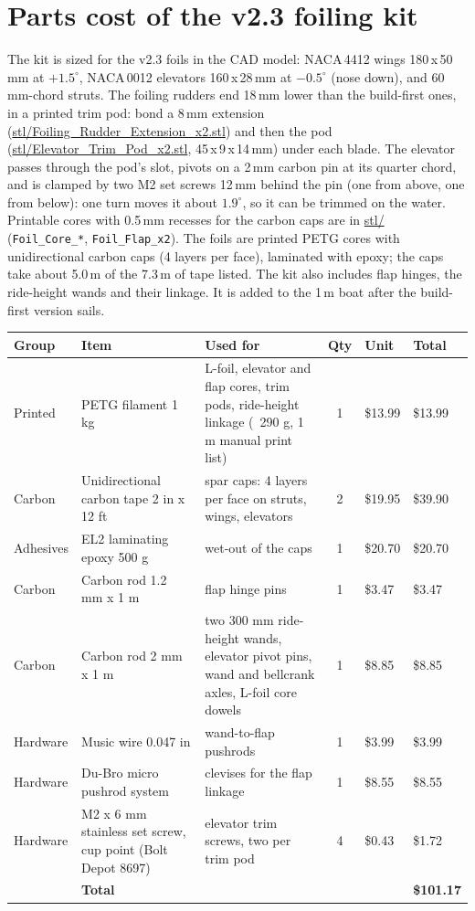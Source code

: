 \documentclass[11pt]{article}
\begin{document}
\section{Parts cost of the v2.3 foiling kit}
The kit is sized for the v2.3 foils in the CAD model: NACA\,4412 wings 180\,x\,50\,mm at $+1.5^\circ$, NACA\,0012 elevators 160\,x\,28\,mm at $-0.5^\circ$ (nose down), and 60\,mm-chord struts. The foiling rudders end 18\,mm lower than the build-first ones, in a printed trim pod: bond a 8\,mm extension (\url{stl/Foiling_Rudder_Extension_x2.stl}) and then the pod (\url{stl/Elevator_Trim_Pod_x2.stl}, 45\,x\,9\,x\,14\,mm) under each blade. The elevator passes through the pod's slot, pivots on a 2\,mm carbon pin at its quarter chord, and is clamped by two M2 set screws 12\,mm behind the pin (one from above, one from below): one turn moves it about $1.9^\circ$, so it can be trimmed on the water. Printable cores with 0.5\,mm recesses for the carbon caps are in \url{stl/} (\texttt{Foil\_Core\_*}, \texttt{Foil\_Flap\_x2}). The foils are printed PETG cores with unidirectional carbon caps (4 layers per face), laminated with epoxy; the caps take about 5.0\,m of the 7.3\,m of tape listed. The kit also includes flap hinges, the ride-height wands and their linkage. It is added to the 1\,m boat after the build-first version sails.
{\small
\begin{longtable}{p{1.5cm}p{4.3cm}p{5.0cm}cp{1.2cm}p{1.2cm}}
\toprule
\textbf{Group} & \textbf{Item} & \textbf{Used for} & \textbf{Qty} & \textbf{Unit} & \textbf{Total} \\
\midrule\endhead
Printed & PETG filament 1 kg & L-foil, elevator and flap cores, trim pods, ride-height linkage (~290 g, 1 m manual print list) & 1 & \$13.99 & \$13.99 \\
Carbon & Unidirectional carbon tape 2 in x 12 ft & spar caps: 4 layers per face on struts, wings, elevators & 2 & \$19.95 & \$39.90 \\
Adhesives & EL2 laminating epoxy 500 g & wet-out of the caps & 1 & \$20.70 & \$20.70 \\
Carbon & Carbon rod 1.2 mm x 1 m & flap hinge pins & 1 & \$3.47 & \$3.47 \\
Carbon & Carbon rod 2 mm x 1 m & two 300 mm ride-height wands, elevator pivot pins, wand and bellcrank axles, L-foil core dowels & 1 & \$8.85 & \$8.85 \\
Hardware & Music wire 0.047 in & wand-to-flap pushrods & 1 & \$3.99 & \$3.99 \\
Hardware & Du-Bro micro pushrod system & clevises for the flap linkage & 1 & \$8.55 & \$8.55 \\
Hardware & M2 x 6 mm stainless set screw, cup point (Bolt Depot 8697) & elevator trim screws, two per trim pod & 4 & \$0.43 & \$1.72 \\
\midrule
& \textbf{Total} & & & & \textbf{\$101.17} \\
\bottomrule
\end{longtable}}
\end{document}
